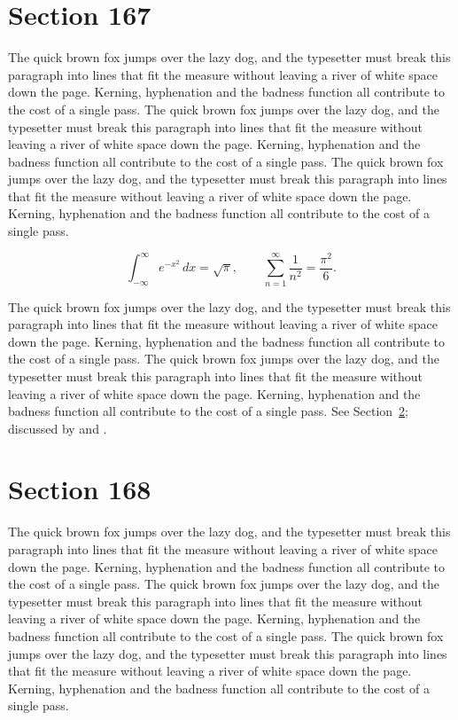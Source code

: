 \documentclass{article}
\begin{document}
\section{Section 167}
\label{sec:167}
The quick brown fox jumps over the lazy dog, and the typesetter must break this paragraph into lines that fit the measure without leaving a river of white space down the page. Kerning, hyphenation and the badness function all contribute to the cost of a single pass. The quick brown fox jumps over the lazy dog, and the typesetter must break this paragraph into lines that fit the measure without leaving a river of white space down the page. Kerning, hyphenation and the badness function all contribute to the cost of a single pass. The quick brown fox jumps over the lazy dog, and the typesetter must break this paragraph into lines that fit the measure without leaving a river of white space down the page. Kerning, hyphenation and the badness function all contribute to the cost of a single pass. 

\begin{equation}\label{eq:167}
\int_{-\infty}^{\infty} e^{-x^{2}}\,dx = \sqrt{\pi}, \qquad
\sum_{n=1}^{\infty} \frac{1}{n^{2}} = \frac{\pi^{2}}{6}.
\end{equation}

The quick brown fox jumps over the lazy dog, and the typesetter must break this paragraph into lines that fit the measure without leaving a river of white space down the page. Kerning, hyphenation and the badness function all contribute to the cost of a single pass. The quick brown fox jumps over the lazy dog, and the typesetter must break this paragraph into lines that fit the measure without leaving a river of white space down the page. Kerning, hyphenation and the badness function all contribute to the cost of a single pass. 
See Section~\ref{sec:168}; discussed by \textcite{k3} and \textcite{l5}.
\section{Section 168}
\label{sec:168}
The quick brown fox jumps over the lazy dog, and the typesetter must break this paragraph into lines that fit the measure without leaving a river of white space down the page. Kerning, hyphenation and the badness function all contribute to the cost of a single pass. The quick brown fox jumps over the lazy dog, and the typesetter must break this paragraph into lines that fit the measure without leaving a river of white space down the page. Kerning, hyphenation and the badness function all contribute to the cost of a single pass. The quick brown fox jumps over the lazy dog, and the typesetter must break this paragraph into lines that fit the measure without leaving a river of white space down the page. Kerning, hyphenation and the badness function all contribute to the cost of a single pass. 
\end{document}
